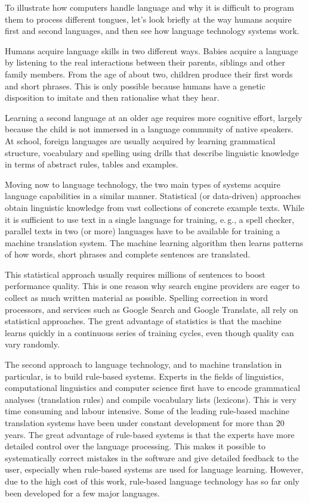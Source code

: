 \begin{multicols}{2}
To illustrate how computers handle language and why it is difficult to program them to process different tongues, let’s look briefly at the way humans acquire first and second languages, and then see how language technology systems work.

Humans acquire language skills in two different ways. Babies acquire a language by listening to the real interactions between their parents, siblings and other family members. From the age of about two, children produce their first words and short phrases. This is only possible because humans have a genetic disposition to imitate and then rationalise what they hear. 

Learning a second language at an older age requires more cognitive effort, largely because the child is not immersed in a language community of native speakers. At school, foreign languages are usually acquired by learning grammatical structure, vocabulary and spelling using drills that describe linguistic knowledge in terms of abstract rules, tables and examples.


Moving now to language technology, the two main types of systems acquire language capabilities in a similar manner. Statistical (or data-driven) approaches obtain linguistic knowledge from vast collections of concrete example texts. While it is sufficient to use text in a single language for training, e.\,g., a spell checker, parallel texts in two (or more) languages have to be available for training a machine translation system. The machine learning algorithm then learns patterns of how words, short phrases and complete sentences are translated. 

This statistical approach usually requires millions of sentences to boost performance quality. This is one reason why search engine providers are eager to collect as much written material as possible. Spelling correction in word processors, and services such as Google Search and Google Translate, all rely on statistical approaches. The great advantage of statistics is that the machine learns quickly in a continuous series of training cycles, even though quality can vary randomly.

The second approach to language technology, and to machine translation in particular, is to build rule-based systems. Experts in the fields of linguistics, computational linguistics and computer science first have to encode grammatical analyses (translation rules) and compile vocabulary lists (lexicons). This is very time consuming and labour intensive. Some of the leading rule-based machine translation systems have been under constant development for more than 20 years. The great advantage of rule-based systems is that the experts have more detailed control over the language processing. This makes it possible to systematically correct mistakes in the software and give detailed feedback to the user, especially when rule-based systems are used for language learning. However, due to the high cost of this work, rule-based language technology has so far only been developed for a few major languages. 


\end{multicols}
